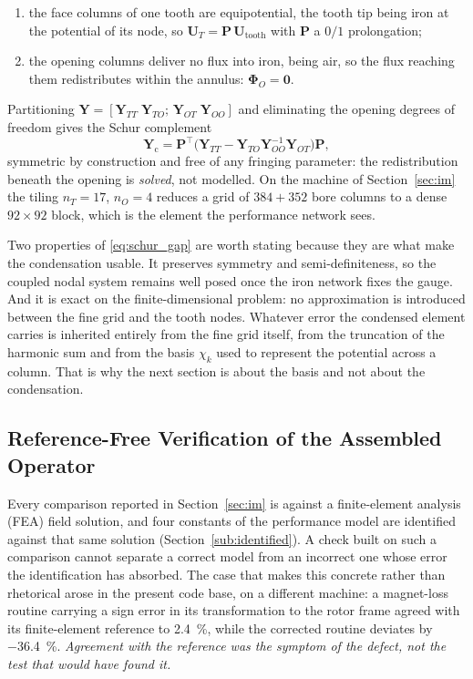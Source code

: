 \documentclass[10pt,a4paper,twocolumn]{article}
\theoremstyle{plain}
\theoremstyle{remark}
\begin{document}
\begin{enumerate}[label=(\roman*),leftmargin=*]
\item the face columns of one tooth are equipotential, the tooth tip
being iron at the potential of its node, so
$\bm{U}_T=\bm{P}\,\bm{U}_{\mathrm{tooth}}$ with $\bm{P}$ a $0/1$
prolongation;
\item the opening columns deliver no flux into iron, being air, so the
flux reaching them redistributes within the annulus:
$\bm{\Phi}_O=\bm{0}$.
\end{enumerate}

Partitioning $\bm{Y}=[\bm{Y}_{TT}\;\bm{Y}_{TO};\,\bm{Y}_{OT}\;
\bm{Y}_{OO}]$ and eliminating the opening degrees of freedom gives the
Schur complement
\begin{equation}
\bm{Y}_{\mathrm{c}}=\bm{P}^{\!\top}\bigl(\bm{Y}_{TT}
-\bm{Y}_{TO}\bm{Y}_{OO}^{-1}\bm{Y}_{OT}\bigr)\bm{P},
\label{eq:schur_gap}
\end{equation}
symmetric by construction and free of any fringing parameter: the
redistribution beneath the opening is \emph{solved}, not modelled. On
the machine of Section~\ref{sec:im} the tiling $n_T=17$, $n_O=4$ reduces
a grid of $384+352$ bore columns to a dense $92\times92$ block, which is
the element the performance network sees.

Two properties of \eqref{eq:schur_gap} are worth stating because they
are what make the condensation usable. It preserves symmetry and
semi-definiteness, so the coupled nodal system remains well posed once
the iron network fixes the gauge. And it is exact on the
finite-dimensional problem: no approximation is introduced between the
fine grid and the tooth nodes. Whatever error the condensed element
carries is inherited entirely from the fine grid itself, from the
truncation of the harmonic sum and from the basis $\chi_k$ used to
represent the potential across a column. That is why the next section is
about the basis and not about the condensation.

\subsection{Reference-Free Verification of the Assembled Operator}
\label{sub:invariants}

Every comparison reported in Section~\ref{sec:im} is against a
finite-element analysis (FEA) field solution, and four constants of the performance
model are identified against that same solution
(Section~\ref{sub:identified}). A check built on such a comparison cannot
separate a correct model from an incorrect one whose error the
identification has absorbed. The case that makes this concrete rather
than rhetorical arose in the present code base, on a different machine: a
magnet-loss routine carrying a sign error in its transformation to the
rotor frame agreed with its finite-element reference to
\SI{2.4}{\percent}, while the corrected routine deviates by
\SI{-36.4}{\percent}. \emph{Agreement with
the reference was the symptom of the defect, not the test that would have
found it.}
\end{document}
